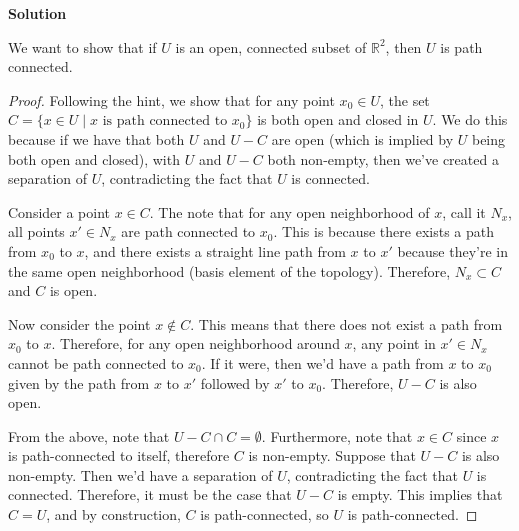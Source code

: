 \documentclass[12pt]{article}
\newcounter{AnswerCounter}
\newcounter{SubAnswerCounter}
\newenvironment{answer}[0]{
  \setcounter{SubAnswerCounter}{1}
  \bigskip
  \textbf{Solution \arabic{AnswerCounter}}
  \\
  \begin{small}
}{
  \end{small}
  \stepcounter{AnswerCounter}
}
\begin{document}
\begin{answer}[Page 158, \#10]
We want to show that if $U$ is an open, connected subset of $\mathbb{R}^2$, then $U$ is path connected.
\begin{proof}
Following the hint, we show that for any point $x_0 \in U$, the set $C = \{x \in U \mid x \text{ is path connected to } x_0 \}$ is both open and closed in $U$. We do this because if we have that both $U$ and $U - C$ are open (which is implied by $U$ being both open and closed), with $U$ and $U - C$ both non-empty, then we've created a separation of $U$, contradicting the fact that $U$ is connected.

Consider a point $x \in C$. The note that for any open neighborhood of $x$, call it $N_x$, all points $x' \in N_x$ are path connected to $x_0$. This is because there exists a path from $x_0$ to $x$, and there exists a straight line path from $x$ to $x'$ because they're in the same open neighborhood (basis element of the topology). Therefore, $N_x \subset C$ and $C$ is open.

Now consider the point $x \notin C$. This means that there does not exist a path from $x_0$ to $x$. Therefore, for any open neighborhood around $x$, any point in $x' \in N_x$ cannot be path connected to $x_0$. If it were, then we'd have a path from $x$ to $x_0$ given by the path from $x$ to $x'$ followed by $x'$ to $x_0$. Therefore, $U - C$ is also open.

From the above, note that $U - C \cap C = \emptyset$. Furthermore, note that $x \in C$ since $x$ is path-connected to itself, therefore $C$ is non-empty. Suppose that $U - C$ is also non-empty. Then we'd have a separation of $U$, contradicting the fact that $U$ is connected. Therefore, it must be the case that $U - C$ is empty. This implies that $C = U$, and by construction, $C$ is path-connected, so $U$ is path-connected.
\end{proof}
\end{answer}
\end{document}
